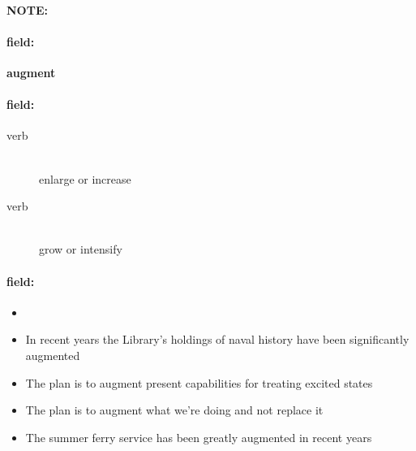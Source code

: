 \documentclass[12pt]{article}
\newenvironment{note}{\paragraph{NOTE:}}{}
\newenvironment{field}{\paragraph{field:}}{}
\begin{document}
\begin{note}
\begin{field}
\textbf{\large augment}
\end{field}


\begin{field}
\begin{description}
\item[verb] \hfill \\ 
enlarge or increase

\item[verb] \hfill \\ 
grow or intensify

\end{description}
\end{field}

\begin{field}
\begin{itemize}
\item 
\item In recent years the Library's holdings of naval history have been significantly augmented
\item The plan is to augment present capabilities for treating excited states
\item The plan is to augment what we're doing and not replace it
\item The summer ferry service has been greatly augmented in recent years
\end{itemize}
\end{field}
\end{note}
\end{document}
